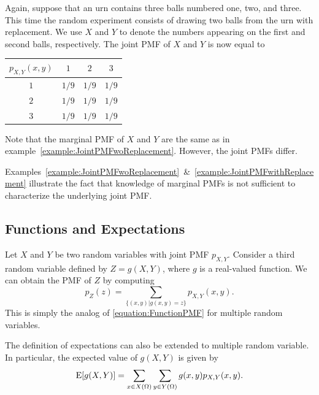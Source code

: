 \begin{example} \label{example:JointPMFwithReplacement}
Again, suppose that an urn contains three balls numbered one, two, and three.
This time the random experiment consists of drawing two balls from the urn with replacement.
We use $X$ and $Y$ to denote the numbers appearing on the first and second balls, respectively.
The joint PMF of $X$ and $Y$ is now equal to
\begin{center}
\begin{tabular}{|c|c|c|c|}
\hline
$p_{X,Y} (x,y)$ & $1$ & $2$ & $3$ \\
\hline
$1$ & $1/9$ & $1/9$ & $1/9$ \\
\hline
$2$ & $1/9$ & $1/9$ & $1/9$ \\
\hline
$3$ & $1/9$ & $1/9$ & $1/9$ \\
\hline
\end{tabular}
\end{center}
Note that the marginal PMF of $X$ and $Y$ are the same as in example~\ref{example:JointPMFwoReplacement}.
However, the joint PMFs differ.
\end{example}

Examples~\ref{example:JointPMFwoReplacement}~\&~\ref{example:JointPMFwithReplacement} illustrate the fact that knowledge of marginal PMFs is not sufficient to characterize the underlying joint PMF.


\subsection{Functions and Expectations}

Let $X$ and $Y$ be two random variables with joint PMF $p_{X,Y}$.
Consider a third random variable defined by $Z = g(X,Y)$, where $g$ is a real-valued function.
We can obtain the PMF of $Z$ by computing
\begin{equation*}
p_Z (z)
= \sum_{\{ (x,y) | g(x,y) = z \}} p_{X,Y} (x, y).
\end{equation*}
This is simply the analog of \eqref{equation:FunctionPMF} for multiple random variables.

The definition of expectations can also be extended to multiple random variable.
In particular, the expected value of $g(X,Y)$ is given by
\begin{equation} \label{equation:ExpectationMultipleRV}
\mathrm{E} [g(X,Y)] = \sum_{x \in X(\Omega)} \sum_{y \in Y(\Omega)} g(x,y) p_{X,Y} (x,y) .
\end{equation}

